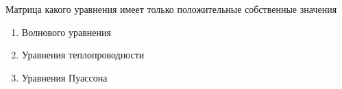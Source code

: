 Матрица какого уравнения имеет только положительные собственные значения

\begin{enumerate}[label=\arabic*)]
    \item Волнового уравнения
    \item Уравнения теплопроводности
    \item Уравнения Пуассона
\end{enumerate}

